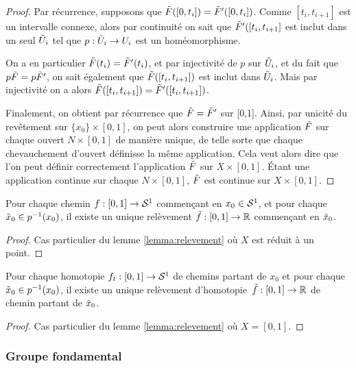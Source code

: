 \documentclass[hidelinks, 10pt]{article}
\begin{document}
\begin{proof}
Par récurrence, supposons que $\Tilde{F}([0,t_i])=\Tilde{F}'([0,t_i])$. Comme $[t_i,t_{i+1}]$ est un intervalle connexe, alors par continuité on sait que $\Tilde{F}'([t_i,t_{i+1}]$ est inclut dans un seul $\Tilde{U}_i$ tel que $p:\Tilde{U}_i\to U_i$ est un homéomorphisme.

On a en particulier $\Tilde{F}(t_i)=\Tilde{F}'(t_i)$, et par injectivité de $p$ sur $\Tilde{U}_i$, et du fait que $p\Tilde{F}=p\Tilde{F}'$, on sait également que $\Tilde{F}([t_i,t_{i+1}])$ est inclut dans $\Tilde{U}_i$. Mais par injectivité on a alors $\Tilde{F}([t_i,t_{i+1}])=\Tilde{F}'([t_i,t_{i+1}])$.

\bigskip Finalement, on obtient par récurrence que $\Tilde{F}=\Tilde{F}'$ sur [0,1]. Ainsi, par unicité du revêtement sur $\{x_0\}\times[0,1]$, on peut alors construire une application $\Tilde{F}$ sur chaque ouvert $N\times[0,1]$ de manière unique, de telle sorte que chaque chevauchement d'ouvert définisse la même application. Cela veut alors dire que l'on peut définir correctement l'application $\Tilde{F}$ sur $X\times[0,1]$. Étant une application continue sur chaque $N\times[0,1]$, $\Tilde{F}$ est continue sur $X\times[0,1]$.
\end{proof}


\begin{corollary}\label{coro:point}
Pour chaque chemin $f:[0,1]\rightarrow\mathcal{S}^{1}$ commençant en $x_0\in\mathcal{S}^{1}$, et pour chaque $\Tilde{x}_0\in p^{-1}(x_0)$, il existe un unique relèvement $\Tilde{f}:[0,1]\rightarrow\mathbb{R}$ commençant en $\Tilde{x}_0$.
\end{corollary}
\begin{proof}
Cas particulier du lemme \ref{lemma:relevement} où $X$ est réduit à un point.
\end{proof}
\begin{corollary}\label{coro:homotopie}
Pour chaque homotopie $f_t:[0,1]\rightarrow\mathcal{S}^{1}$ de chemins partant de $x_0$ et pour chaque $\Tilde{x}_0\in p^{-1}(x_0)$, il existe un unique relèvement d'homotopie~$\Tilde{f}:[0,1]\rightarrow\mathbb{R}$ de chemin partant de $\Tilde{x}_0$.
\end{corollary}
\begin{proof}
Cas particulier du lemme \ref{lemma:relevement} où $X=[0,1]$.
\end{proof}

\subsubsection{Groupe fondamental}
\end{document}
